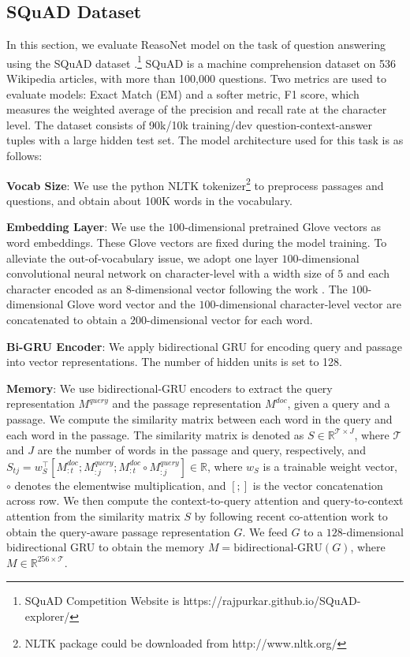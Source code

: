 \documentclass[sigconf]{acmart}
\begin{document}
\subsection{SQuAD Dataset}
In this section, we evaluate ReasoNet model on the task of question answering using the SQuAD dataset \citep{Squad2016}.\footnote{SQuAD Competition Website is https://rajpurkar.github.io/SQuAD-explorer/} SQuAD is a machine comprehension dataset on 536 Wikipedia articles, with
more than 100,000 questions. Two metrics are used to evaluate models: Exact Match (EM) and a softer metric, F1 score, which measures the weighted average of the precision and recall rate at the character level. The dataset consists of 90k/10k training/dev question-context-answer tuples with a large hidden test set. The model architecture used for this task is as follows:

\textbf{Vocab Size}: We use the python NLTK tokenizer\footnote{NLTK package could be downloaded from http://www.nltk.org/} to preprocess passages and questions, and obtain about 100K words in the vocabulary.   

\textbf{Embedding Layer}: We use the $100$-dimensional pretrained Glove vectors \citep{GloveEMNLP2014} as word embeddings. These Glove vectors are fixed during the model training. To alleviate the out-of-vocabulary issue, we adopt one layer $100$-dimensional convolutional neural network on character-level with a width size of $5$ and each character encoded as an $8$-dimensional vector following the work \citep{DBLP:journals/corr/SeoKFH16}. The $100$-dimensional Glove word vector and the $100$-dimensional character-level vector are concatenated to obtain a $200$-dimensional vector for each word.

\textbf{Bi-GRU Encoder}: We apply bidirectional GRU for encoding query and passage into vector representations. The number of hidden units is set to 128.

\textbf{Memory}: We use bidirectional-GRU encoders to extract the query representation $M^{query}$ and the passage representation $M^{doc}$, given a query and a passage. 
We compute the similarity matrix between each word in the query and each word in the passage. The similarity matrix is denoted as $S \in \mathbb{R}^{\mathcal{T} \times J}$, where $\mathcal{T}$ and $J$ are the number of words in the passage and query, respectively, and $S_{tj} = w_{S}^\intercal  [ M^{doc}_{:t}; M^{query}_{:j}; M^{doc}_{:t} \circ M^{query}_{:j} ] \in \mathbb{R} $, where $w_S$ is a trainable weight vector, $\circ$ denotes the elementwise multiplication,
and $[;]$ is the vector concatenation across row.
We then compute the context-to-query attention and query-to-context attention from the similarity matrix $S$ by following recent co-attention work \citep{DBLP:journals/corr/SeoKFH16} to obtain the query-aware passage representation $G$. We feed $G$ to a $128$-dimensional bidirectional GRU to obtain the memory $M = \text{bidirectional-GRU}(G)$, where $M \in \mathbb{R}^{256 \times \mathcal{T}}$. 
\end{document}
